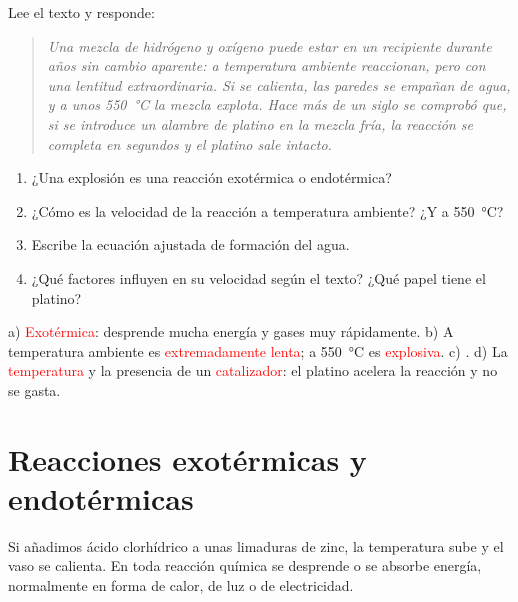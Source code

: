 \begin{exercise}
    Lee el texto y responde:

    \begin{quote}
        \emph{Una mezcla de hidrógeno y oxígeno puede estar en un recipiente durante años sin cambio aparente: a temperatura ambiente reaccionan, pero con una lentitud extraordinaria. Si se calienta, las paredes se empañan de agua, y a unos \qty{550}{\celsius} la mezcla explota. Hace más de un siglo se comprobó que, si se introduce un alambre de platino en la mezcla fría, la reacción se completa en segundos y el platino sale intacto.}
    \end{quote}

    \begin{enumerate}[label=\alph*)]
        \item ¿Una explosión es una reacción exotérmica o endotérmica?
        \item ¿Cómo es la velocidad de la reacción a temperatura ambiente? ¿Y a \qty{550}{\celsius}?
        \item Escribe la ecuación ajustada de formación del agua.
        \item ¿Qué factores influyen en su velocidad según el texto? ¿Qué papel tiene el platino?
    \end{enumerate}
    \begin{solu}
        a) \textcolor{red}{Exotérmica}: desprende mucha energía y gases muy rápidamente.
        b) A temperatura ambiente es \textcolor{red}{extremadamente lenta}; a \qty{550}{\celsius} es \textcolor{red}{explosiva}.
        c) .
        d) La \textcolor{red}{temperatura} y la presencia de un \textcolor{red}{catalizador}: el platino acelera la reacción y no se gasta.
    \end{solu}
\end{exercise}

\section{Reacciones exotérmicas y endotérmicas}

Si añadimos ácido clorhídrico a unas limaduras de zinc, la temperatura sube y el vaso se calienta. En toda reacción química se desprende o se absorbe energía, normalmente en forma de calor, de luz o de electricidad.


